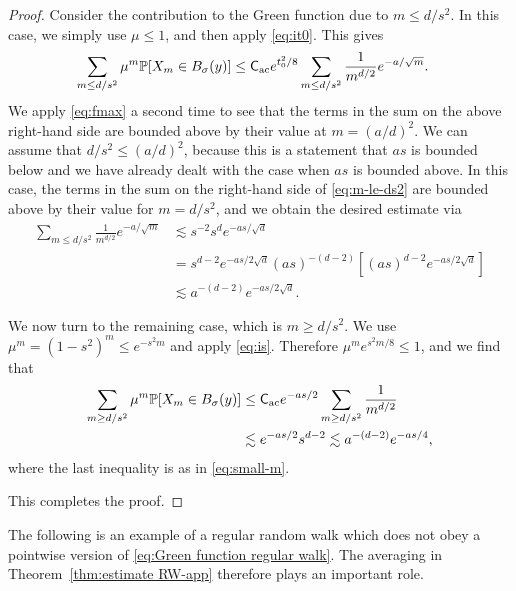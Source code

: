 \documentclass[11pt,a4paper]{article}
\numberwithin{equation}{section}
\theoremstyle{plain}
\theoremstyle{definition}
\newcommand\1{\mathds{1}}
\newcommand{\CAC}{\mathsf C_{\textup{ac}}}
\begin{document}
\begin{proof}
Consider the contribution to the Green function due to
$m \le d/s^2$.  In this case, we simply use $\mu \le 1$, and then apply
\eqref{eq:it0}.  This gives
\begin{align}
    \sum_{m \le d/s^2} \mu^m \mathbb P[X_m\in B_\sigma(y)]
    & \le
    \CAC e^{t_0^2/8}
    \sum_{m \le d/s^2}   \frac{1}{m^{d/2}} e^{-a/\sqrt{m}}.
\label{eq:m-le-ds2}
\end{align}
We apply \eqref{eq:fmax} a second time
to see that the terms in the sum on the above right-hand side are bounded above
by their value at $m=(a/d)^2$.
We can assume that $d/s^{2} \le (a/d)^2$, because this is a statement
that $as$ is bounded below and we have already dealt with the case when
$as$ is bounded above.  In this case, the terms in the sum on the
right-hand side of \eqref{eq:m-le-ds2} are bounded above by their value for $m=d/s^2$,
and we obtain the desired estimate via
\begin{align}
    \sum_{m \le d/s^2}   \frac{1}{m^{d/2}} e^{-a/\sqrt{m}}
    & \lesssim
    s^{-2} s^{d} e^{-as/\sqrt{d}}
    \\ \nonumber &=
    s^{d-2} e^{-as/2\sqrt{d}}(as)^{-(d-2)}[(as)^{d-2}e^{-as/2\sqrt{d}}]
    \\ \nonumber & \lesssim
    a^{-(d-2)}e^{-as/2\sqrt{d}} .
\label{eq:small-m}
\end{align}

We now turn to the remaining case, which is $m \ge d/s^2 $.
We use $\mu^m =(1-s^2)^m \le e^{-s^2m}$ and apply \eqref{eq:is}.
Therefore $\mu^m e^{s^2m/8} \le 1$, and we find that
\begin{align}
    \sum_{m \ge d/s^2} \mu^m \mathbb P[X_m\in B_\sigma(y)]
    & \le
    \CAC e^{-as/2}
    \sum_{m \ge d/s^2}   \frac{1}{m^{d/2}}
    \\ \nonumber & \lesssim
    e^{-as/2} s^{d-2}
    \lesssim a^{-(d-2)} e^{-as/4},
\end{align}
where the last inequality is as in \eqref{eq:small-m}.

This completes the proof.
\end{proof}

The following is an example of a regular random walk which does not
obey a pointwise version of \eqref{eq:Green function regular walk}.
The averaging in Theorem~\ref{thm:estimate RW-app} therefore plays an important role.
\end{document}
